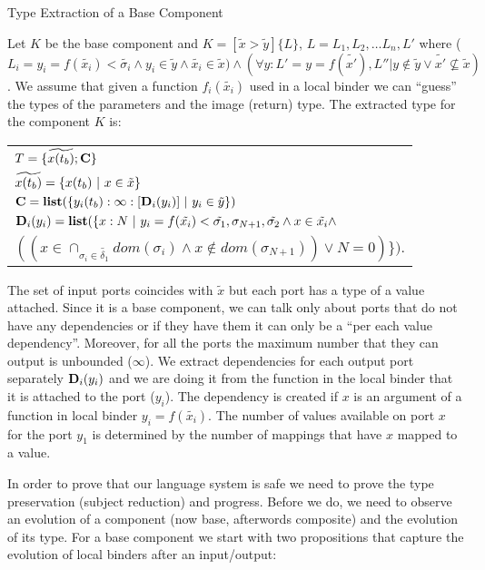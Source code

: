 \begin{definition}{Type Extraction of a Base Component}

Let $K$ be the base component and $K=[\tilde{x}>\tilde{y}]\{L\}$, $L=L_1,L_2, \dots L_n, L'$ where ($L_i=y_i=f(\tilde{x_i})<\tilde{\sigma_i}  \wedge  y_i\in \tilde{y} \wedge \tilde{x_i}\in \tilde{x}) \wedge (\forall y: L'=y=f(\tilde{x'}),L''| y\notin \tilde{y} \lor  \tilde{x'}\nsubseteq \tilde{x})$. We assume that given a function $f_i(\tilde{x_i})$ used in a local binder we can “guess” the types of the parameters and the image (return) type. The extracted type for the component $K$ is:\\

\begin{tabular}{l}

$T=\{\widetilde{x(t_b)}; \textbf{C}\}$\\
$\widetilde{\depen{x}{t_b}}=\{\depen{x}{t_b}\ |\ x\in \tilde{x}\}$\\
$\textbf{C}= \textbf{list}(\{y_i(t_b):\infty:[\textbf{D}_i(y_i)]\ |\  y_i\in \tilde{y}\})$\\
$\D_i(y_i)=\stl(\{ \pev{x}{N} \ |\  y_i=f(\tilde{x_i})<\tilde{\sigma_1}, \sigma_{N+1}, \tilde{\sigma_2}   \wedge x\in \tilde{x_i}  \wedge$\\ $((x\in\cap_{\sigma_i\in\tilde{\delta_1}}dom(\sigma_i) \wedge x\notin dom(\sigma_{N+1})) \lor N=0)\})$.

\end{tabular}

\end{definition}
The set of input ports coincides with $\tilde{x}$ but each port has a type of a value attached.
Since it is a base component, we can talk only about ports that do not have any dependencies or if they have them it can only be a ``per each value dependency''. Moreover, for all the ports the maximum number that they can output is unbounded ($\infty$). We extract dependencies for each output port separately {$\textbf{D}_i(y_i)$} and we are doing it from the function in the local binder that it is attached to the port ($y_i$). The dependency is created if $x$ is an argument of a function in local binder $y_i=f(\tilde{x_i})$. The number of values available on port $x$ for the port $y_1$ is determined by the number of mappings that have  $x$ mapped to a value. 



In order to prove that our language system is safe we need to prove the type preservation (subject reduction) and progress. Before we do, we need to observe an evolution of a component (now base, afterwords composite) and the evolution of its type. 
For a base component we start with two propositions that capture the evolution of local binders after an input/output:



